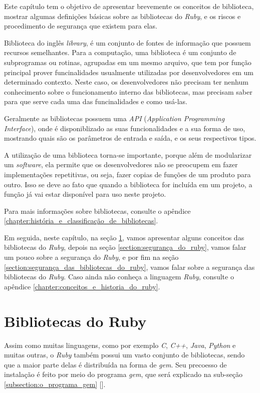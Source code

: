 Este capítulo tem o objetivo de apresentar brevemente os conceitos de biblioteca,
mostrar algumas definições básicas sobre as bibliotecas do \emph{Ruby}, e os riscos
e procedimento de segurança que existem para elas.

Biblioteca do inglês \emph{library}, é um conjunto de fontes de informação que possuem recursos
semelhantes. Para a computação, uma biblioteca é um conjunto de subprogramas ou
rotinas, agrupadas em um mesmo arquivo, que tem por função principal prover funcinalidades
usualmente utilizadas por desenvolvedores em um determinado contexto. Neste caso, os
desenvolvedores não precisam ter nenhum conhecimento sobre o funcionamento interno das
bibliotecas, mas precisam saber para que serve cada uma das funcinalidades e como usá-las.

Geralmente as bibliotecas possuem uma \emph{API} (\emph{Application Programming Interface}), onde
é disponiblizado as suas funcionalidades e a sua forma de uso, mostrando quais são os
parâmetros de entrada e saída, e os seus respectivos tipos.

A utilização de uma biblioteca torna-se importante, porque além de modularizar um \emph{software}, ela
permite que os desenvolvedores não se preocupem em fazer implementações repetitivas, ou seja, fazer
copias de funções de um produto para outro. Isso se deve ao fato que quando a biblioteca for
incluída em um projeto, a função já vai estar disponível para uso neste projeto.

Para mais informações sobre bibliotecas, consulte o apêndice
\ref{chapter:história_e_classificação_de_bibliotecas}.

Em seguida, neste capítulo, na seção \ref{section:bibliotecas_do_ruby}, vamos apresentar alguns
conceitos das bibliotecas do \emph{Ruby}, depois na seção \ref{section:segurança_do_ruby},
vamos falar um pouco sobre a segurança do \emph{Ruby}, e por fim na seção
\ref{section:segurança_das_bibliotecas_do_ruby}, vamos falar sobre a segurança das bibliotecas do
\emph{Ruby}. Caso ainda não conheça a linguagem \emph{Ruby}, consulte o apêndice
\ref{chapter:conceitos_e_historia_do_ruby}.

\section{Bibliotecas do Ruby}
\label{section:bibliotecas_do_ruby}

Assim como muitas linguagens, como por exemplo \emph{C}, \emph{C++}, \emph{Java}, \emph{Python} e muitas
outras, o \emph{Ruby} também possui um vasto conjunto de bibliotecas, sendo que a maior parte
delas é distribuída na forma de \emph{gem}. Seu precoesso de instalação é feito por meio do programa
\emph{gem}, que será explicado na sub-seção \ref{subsection:o_programa_gem} [].

